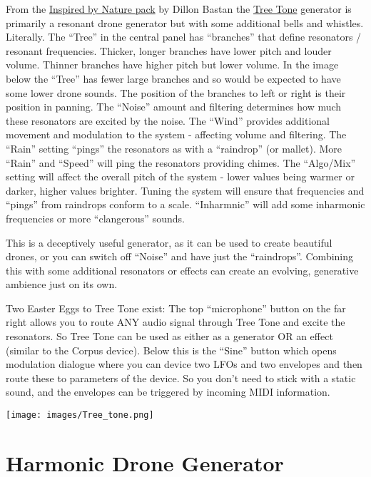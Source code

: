 \documentclass[
  12pt,
  letterpaper,
  oneside,
  open=any]{scrbook}
\begin{document}
From the
\href{https://www.ableton.com/en/packs/inspired-nature/\#?item_type=max_for_live}{Inspired
by Nature pack} by Dillon Bastan the
\href{https://www.youtube.com/watch?v=_mk7qyzEcCQ}{Tree Tone} generator
is primarily a resonant drone generator but with some additional bells
and whistles. Literally. The ``Tree'' in the central panel has
``branches'' that define resonators / resonant frequencies. Thicker,
longer branches have lower pitch and louder volume. Thinner branches
have higher pitch but lower volume. In the image below the ``Tree'' has
fewer large branches and so would be expected to have some lower drone
sounds. The position of the branches to left or right is their position
in panning. The ``Noise'' amount and filtering determines how much these
resonators are excited by the noise. The ``Wind'' provides additional
movement and modulation to the system - affecting volume and filtering.
The ``Rain'' setting ``pings'' the resonators as with a ``raindrop'' (or
mallet). More ``Rain'' and ``Speed'' will ping the resonators providing
chimes. The ``Algo/Mix'' setting will affect the overall pitch of the
system - lower values being warmer or darker, higher values brighter.
Tuning the system will ensure that frequencies and ``pings'' from
raindrops conform to a scale. ``Inharmnic'' will add some inharmonic
frequencies or more ``clangerous'' sounds.

This is a deceptively useful generator, as it can be used to create
beautiful drones, or you can switch off ``Noise'' and have just the
``raindrops''. Combining this with some additional resonators or effects
can create an evolving, generative ambience just on its own.

Two Easter Eggs to Tree Tone exist: The top ``microphone'' button on the
far right allows you to route ANY audio signal through Tree Tone and
excite the resonators. So Tree Tone can be used as either as a generator
OR an effect (similar to the Corpus device). Below this is the ``Sine''
button which opens modulation dialogue where you can device two LFOs and
two envelopes and then route these to parameters of the device. So you
don't need to stick with a static sound, and the envelopes can be
triggered by incoming MIDI information.

\texttt{[image: images/Tree\_tone.png]}

\section{Harmonic Drone Generator}\label{harmonic-drone-generator}
\end{document}
